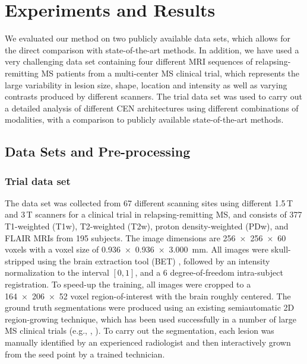 
\section{Experiments and Results}


We evaluated our method on two publicly available data sets, which allows for
the direct comparison with state-of-the-art methods. In addition, we have used a
very challenging data set containing four different MRI sequences of
relapsing-remitting MS patients from a multi-center MS clinical trial, which
represents the large variability in lesion size, shape, location and intensity
as well as varying contrasts produced by different scanners. The trial data set
was used to carry out a detailed analysis of different CEN architectures using
different combinations of modalities, with a comparison to publicly available
state-of-the-art methods.

\subsection{Data Sets and Pre-processing}



\subsubsection{Trial data set}

The data set was collected from 67 different scanning sites using different
1.5\,T and 3\,T scanners for a clinical trial in relapsing-remitting MS, and
consists of 377 T1-weighted (T1w), T2-weighted (T2w), proton density-weighted
(PDw), and FLAIR MRIs from 195 subjects. The image dimensions are
\num{256x256x60} voxels with a voxel size of
\SI{0.936x0.936x3.000}{\milli\metre}. All images were skull-stripped using the
brain extraction tool (BET) \cite{jenkinson2005bet2}, followed by an intensity
normalization to the interval $[0,1]$, and a 6 degree-of-freedom intra-subject
registration. To speed-up the training, all images were cropped to a
\num{164x206x52} voxel region-of-interest with the brain roughly centered. The
ground truth segmentations were produced using an existing semiautomatic 2D
region-growing technique, which has been used successfully in a number of large
MS clinical trials (e.g., \cite{kappos2006long},
\cite{traboulsee2008reduction}). To carry out the segmentation, each lesion was
manually identified by an experienced radiologist and then interactively grown
from the seed point by a trained technician.

